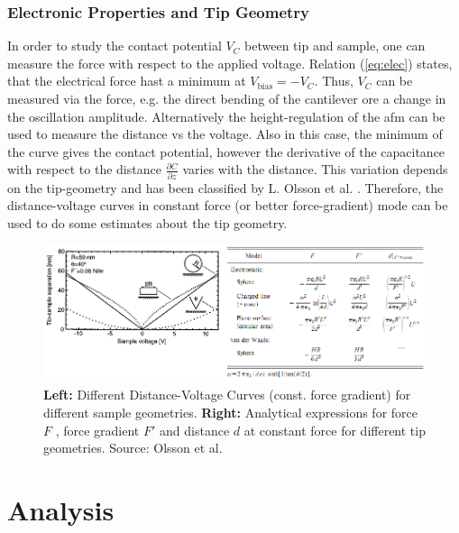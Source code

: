 \documentclass[a4paper]{scrartcl}
\numberwithin{equation}{section}
\numberwithin{figure}{section}
\numberwithin{table}{section}
\newcommand{\Formel}[1]{(\ref{#1})}
\begin{document}
\subsubsection*{Electronic Properties and Tip Geometry}
In order to study the contact potential $V_C$ between tip and sample, one can measure the force with respect to the applied voltage. Relation \Formel{eq:elec} states, that the electrical force hast a minimum at $V_\text{bias} = -V_C$. Thus, $V_C$ can be measured via the force, e.g. the direct bending of the cantilever ore a change in the oscillation amplitude. Alternatively the height-regulation of the afm can be used to measure the distance vs the voltage. Also in this case, the minimum of the curve gives the contact potential, however the derivative of the capacitance with respect to the distance $\frac{\partial C}{\partial z}$ varies with the distance. This variation depends on the tip-geometry and has been classified by L. Olsson et al. \cite{olsson}. Therefore, the distance-voltage curves in constant force (or better force-gradient) mode can be used to do some estimates about the tip geometry.

\begin{figure} 
 \centering
       \includegraphics[width=\linewidth]{img/tip.png}
\caption{
\small \textbf{Left:} Different Distance-Voltage Curves (const. force gradient) for different sample geometries. \textbf{Right:} Analytical expressions for force $F$ , force gradient $F'$ and distance $d$ at constant force for different tip geometries. Source: Olsson et al. \cite{olsson} } 
	\label{fig:geometry}
\end{figure}

\clearpage
\section{Analysis}
\end{document}
